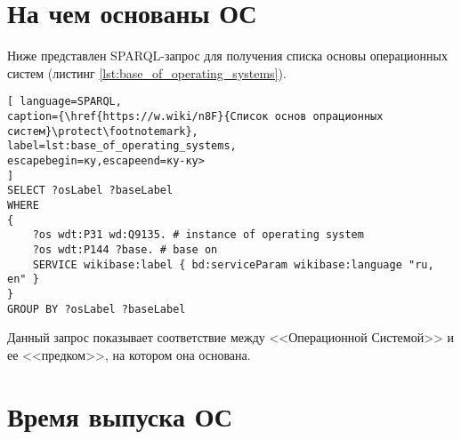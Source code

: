 \section{На чем основаны ОС}
Ниже представлен SPARQL-запрос для получения списка основы операционных систем (листинг \ref{lst:base_of_operating_systems}).



\begin{lstlisting}[ language=SPARQL, 
caption={\href{https://w.wiki/n8F}{Список основ опрационных систем}\protect\footnotemark},
label=lst:base_of_operating_systems, 
escapebegin=ку,escapeend=ку-ку>
]
SELECT ?osLabel ?baseLabel
WHERE
{
	?os wdt:P31 wd:Q9135. # instance of operating system
	?os wdt:P144 ?base. # base on 
	SERVICE wikibase:label { bd:serviceParam wikibase:language "ru, en" }
}
GROUP BY ?osLabel ?baseLabel
\end{lstlisting}

Данный запрос показывает соответствие между <<Операционной Системой>> и ее <<предком>>, на котором она основана.


\section{Время выпуска ОС}

